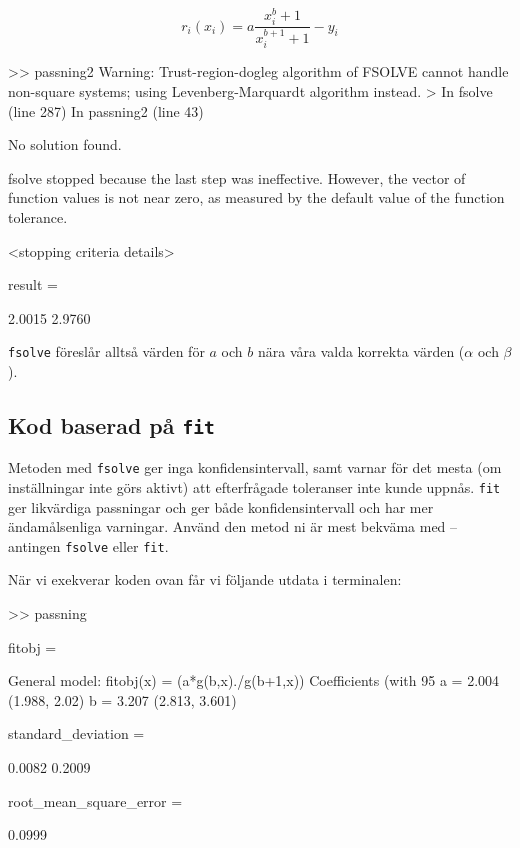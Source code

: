 \begin{equation}
  \label{eq:ex}
  r_i(x_i) = a\frac{x_i^b+1}{x_i^{b+1}+1} - y_i
\end{equation}


\begin{terminaloutput}
>> passning2
Warning: Trust-region-dogleg algorithm of FSOLVE cannot handle non-square systems; using Levenberg-Marquardt algorithm instead. 
> In fsolve (line 287)
  In passning2 (line 43) 

No solution found.

fsolve stopped because the last step was ineffective. However, the vector of function
values is not near zero, as measured by the default value of the function tolerance. 

<stopping criteria details>


result =

    2.0015    2.9760
\end{terminaloutput}
{\tt fsolve} föreslår alltså värden för $a$ och $b$ nära våra valda
korrekta värden ($\alpha$ och $\beta$).

\subsection{Kod baserad på {\tt fit}}
\label{sec:matlab-fit}
Metoden med {\tt fsolve} ger inga konfidensintervall, 
samt varnar för det mesta (om inställningar inte
görs aktivt) att efterfrågade toleranser inte kunde uppnås.
{\tt fit} ger likvärdiga passningar och ger både konfidensintervall och
har mer ändamålsenliga varningar. Använd den metod ni är mest bekväma med
-- antingen {\tt fsolve} eller {\tt fit}.


När vi exekverar koden ovan får vi följande utdata i terminalen:

\begin{terminaloutput}
>> passning

fitobj = 

     General model:
     fitobj(x) = (a*g(b,x)./g(b+1,x))
     Coefficients (with 95%
       a =       2.004  (1.988, 2.02)
       b =       3.207  (2.813, 3.601)

standard_deviation =

    0.0082    0.2009


root_mean_square_error =

    0.0999
\end{terminaloutput}

